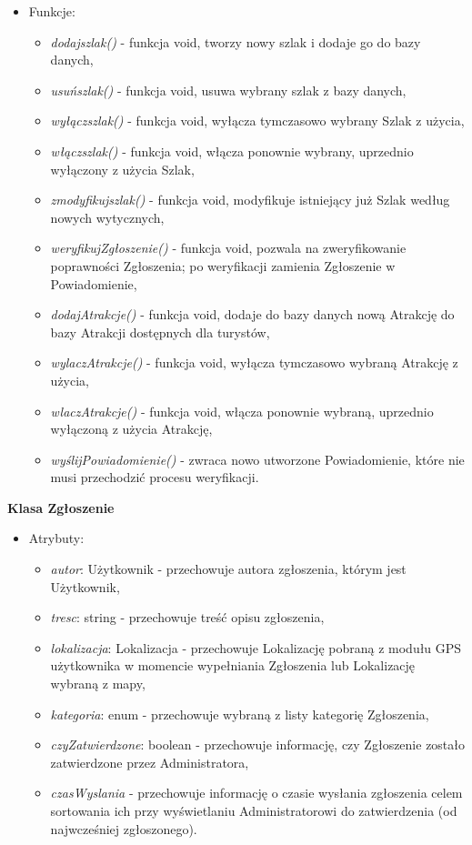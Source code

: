     \begin{itemize}
        \item []Funkcje:
        \begin{itemize}
            \item \textit{dodajszlak()} - funkcja void, tworzy nowy szlak i dodaje go do bazy danych,
            \item \textit{usuńszlak()} - funkcja void, usuwa wybrany szlak z bazy danych,
            \item \textit{wyłączszlak()} - funkcja void, wyłącza tymczasowo wybrany Szlak z użycia,
            \item \textit{włączszlak()} - funkcja void, włącza ponownie wybrany, uprzednio wyłączony z użycia Szlak,
            \item \textit{zmodyfikujszlak()} - funkcja void, modyfikuje istniejący już Szlak według nowych wytycznych,
            \item \textit{weryfikujZgłoszenie()} - funkcja void, pozwala na zweryfikowanie poprawności Zgłoszenia; po weryfikacji zamienia Zgłoszenie w Powiadomienie,
            \item \textit{dodajAtrakcje()} - funkcja void, dodaje do bazy danych nową Atrakcję do bazy Atrakcji dostępnych dla turystów,
            \item \textit{wylaczAtrakcje()} - funkcja void, wyłącza tymczasowo wybraną Atrakcję z użycia,
            \item \textit{wlaczAtrakcje()} - funkcja void, włącza ponownie wybraną, uprzednio wyłączoną z użycia Atrakcję,
            \item \textit{wyślijPowiadomienie()} - zwraca nowo utworzone Powiadomienie, które nie musi przechodzić procesu weryfikacji.
        \end{itemize}
    \end{itemize}
    \textbf{Klasa Zgłoszenie} 
    \begin{itemize}
        \item []Atrybuty:
        \begin{itemize}
            \item \textit{autor}: Użytkownik - przechowuje autora zgłoszenia, którym jest Użytkownik,
            \item \textit{tresc}: string - przechowuje treść opisu zgłoszenia,
            \item \textit{lokalizacja}: Lokalizacja - przechowuje Lokalizację pobraną z modułu GPS użytkownika w momencie wypełniania Zgłoszenia lub Lokalizację wybraną z mapy,
            \item \textit{kategoria}: enum - przechowuje wybraną z listy kategorię Zgłoszenia,
            \item \textit{czyZatwierdzone}: boolean - przechowuje informację, czy Zgłoszenie zostało zatwierdzone przez Administratora,
            \item \textit{czasWyslania} - przechowuje informację o czasie wysłania zgłoszenia celem sortowania ich przy wyświetlaniu Administratorowi do zatwierdzenia (od najwcześniej zgłoszonego).
        \end{itemize}
    \end{itemize}
